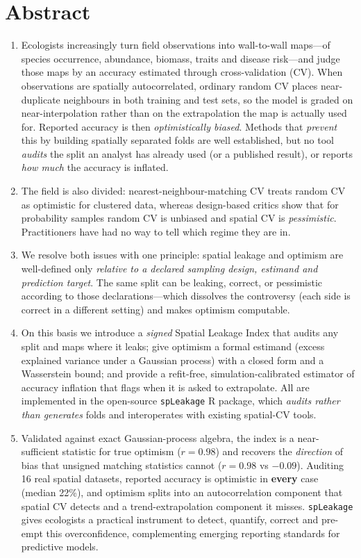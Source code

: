 \documentclass[11pt,a4paper]{article}
\begin{document}
\section*{Abstract}
\begin{enumerate}[label=\arabic*.,leftmargin=1.6em,itemsep=3pt]
\item Ecologists increasingly turn field observations into wall-to-wall maps---of
species occurrence, abundance, biomass, traits and disease risk---and judge those
maps by an accuracy estimated through cross-validation (CV). When observations are
spatially autocorrelated, ordinary random CV places near-duplicate neighbours in
both training and test sets, so the model is graded on near-interpolation rather
than on the extrapolation the map is actually used for. Reported accuracy is then
\emph{optimistically biased}. Methods that \emph{prevent} this by building
spatially separated folds are well established, but no tool \emph{audits} the split
an analyst has already used (or a published result), or reports \emph{how much} the
accuracy is inflated.

\item The field is also divided: nearest-neighbour-matching CV treats random CV as
optimistic for clustered data, whereas design-based critics show that for
probability samples random CV is unbiased and spatial CV is \emph{pessimistic}.
Practitioners have had no way to tell which regime they are in.

\item We resolve both issues with one principle: spatial leakage and optimism are
well-defined only \emph{relative to a declared sampling design, estimand and
prediction target}. The same split can be leaking, correct, or pessimistic
according to those declarations---which dissolves the controversy (each side is
correct in a different setting) and makes optimism computable.

\item On this basis we introduce a \emph{signed} Spatial Leakage Index that audits
any split and maps where it leaks; give optimism a formal estimand (excess
explained variance under a Gaussian process) with a closed form and a Wasserstein
bound; and provide a refit-free, simulation-calibrated estimator of accuracy
inflation that flags when it is asked to extrapolate. All are implemented in the
open-source \texttt{spLeakage} R package, which \emph{audits rather than generates}
folds and interoperates with existing spatial-CV tools.

\item Validated against exact Gaussian-process algebra, the index is a
near-sufficient statistic for true optimism ($r=0.98$) and recovers the
\emph{direction} of bias that unsigned matching statistics cannot ($r=0.98$ vs
$-0.09$). Auditing 16 real spatial datasets, reported accuracy is optimistic in
\textbf{every} case (median 22\%), and optimism splits into an autocorrelation
component that spatial CV detects and a trend-extrapolation component it misses.
\texttt{spLeakage} gives ecologists a practical instrument to detect, quantify,
correct and pre-empt this overconfidence, complementing emerging reporting
standards for predictive models.
\end{enumerate}
\end{document}
